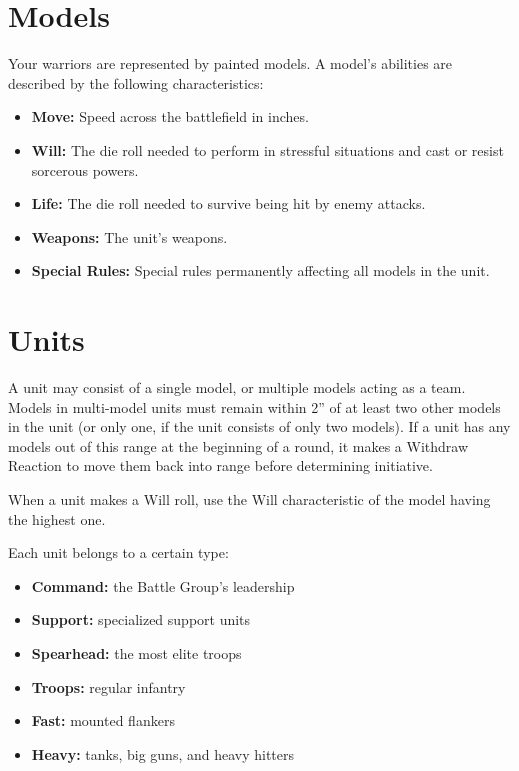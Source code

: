 \begin{multicols}{2}
\section*{Models}

Your warriors are represented by painted models. A model's abilities are described by the following characteristics:
\begin{itemize}
    \item \textbf{Move:} Speed across the battlefield in inches.
    \item \textbf{Will:} The die roll needed to perform in stressful situations and cast or resist sorcerous powers.
    \item \textbf{Life:} The die roll needed to survive being hit by enemy attacks.
    \item \textbf{Weapons:} The unit's weapons.
    \item \textbf{Special Rules:} Special rules permanently affecting all models in the unit.
\end{itemize}





\section*{Units}

A unit may consist of a single model, or multiple models acting as a team. Models in multi-model units must remain within 2'' of at least two other models in the unit (or only one, if the unit consists of only two models). If a unit has any models out of this range at the beginning of a round, it makes a Withdraw Reaction to move them back into range before determining initiative.

When a unit makes a Will roll, use the Will characteristic of the model having the highest one.

Each unit belongs to a certain type:

\begin{itemize}
    \item \textbf{Command:} the Battle Group's leadership
    \item \textbf{Support:} specialized support units
    \item \textbf{Spearhead:} the most elite troops
    \item \textbf{Troops:} regular infantry
    \item \textbf{Fast:} mounted flankers
    \item \textbf{Heavy:} tanks, big guns, and heavy hitters
\end{itemize}





\end{multicols}

